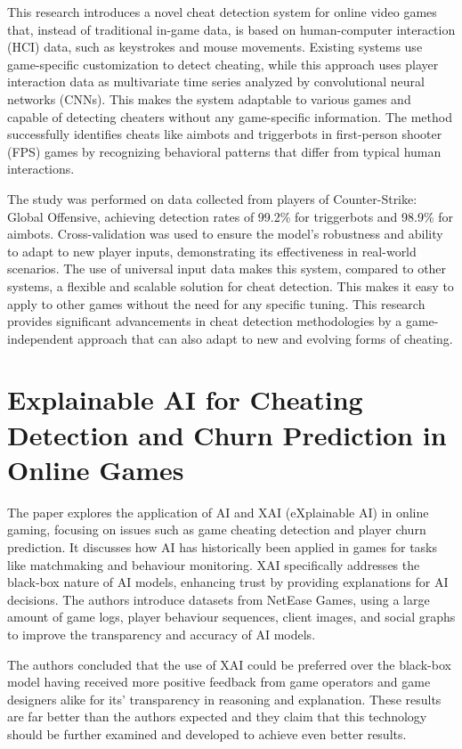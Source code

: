 This research introduces a novel cheat detection system for online video games that, instead of traditional in-game data, is based on human-computer interaction (HCI) data, such as keystrokes and mouse movements. Existing systems use game-specific customization to detect cheating, while this approach uses player interaction data as multivariate time series analyzed by convolutional neural networks (CNNs). This makes the system adaptable to various games and capable of detecting cheaters without any game-specific information. The method successfully identifies cheats like aimbots and triggerbots in first-person shooter (FPS) games by recognizing behavioral patterns that differ from typical human interactions.

The study was performed on data collected from players of Counter-Strike: Global Offensive, achieving detection rates of 99.2\% for triggerbots and 98.9\% for aimbots. Cross-validation was used to ensure the model’s robustness and ability to adapt to new player inputs, demonstrating its effectiveness in real-world scenarios. The use of universal input data makes this system, compared to other systems, a flexible and scalable solution for cheat detection. This makes it easy to apply to other games without the need for any specific tuning. This research provides significant advancements in cheat detection methodologies by a game-independent approach that can also adapt to new and evolving forms of cheating.

\section{Explainable AI for Cheating Detection and Churn Prediction in Online Games \cite{tao2022explainable}}

The paper explores the application of AI and XAI (eXplainable AI) in online gaming, focusing on issues such as game cheating detection and player churn prediction. It discusses how AI has historically been applied in games for tasks like matchmaking and behaviour monitoring. XAI specifically addresses the black-box nature of AI models, enhancing trust by providing explanations for AI decisions. The authors introduce datasets from NetEase Games, using a large amount of game logs, player behaviour sequences, client images, and social graphs to improve the transparency and accuracy of AI models.

The authors concluded that the use of XAI could be preferred over the black-box model having received more positive feedback from game operators and game designers alike for its’ transparency in reasoning and explanation. These results are far better than the authors expected and they claim that this technology should be further examined and developed to achieve even better results.
